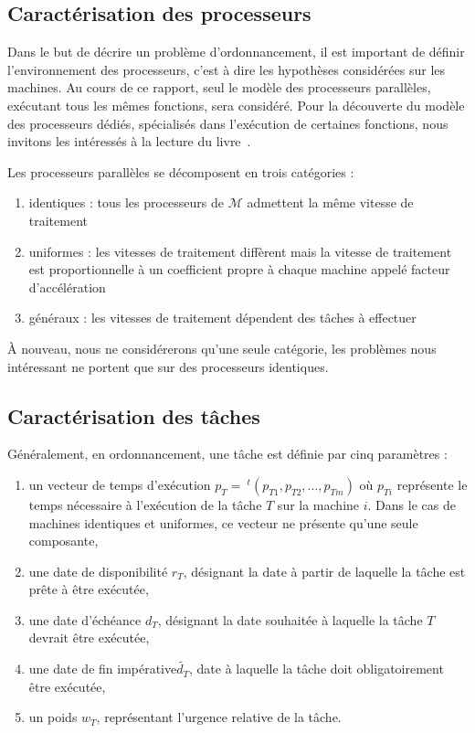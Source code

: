 \subsection{Caractérisation des processeurs}

Dans le but de décrire un problème d'ordonnancement, il est important de définir l'environnement des
processeurs, c'est à dire les hypothèses considérées sur les machines. Au cours de ce rapport, seul
le modèle des processeurs parallèles, exécutant tous les mêmes fonctions, sera considéré. Pour la
découverte du modèle des processeurs dédiés, spécialisés dans l'exécution de certaines fonctions,
nous invitons les intéressés à la lecture du livre~\cite{blazewicz_handbook_2007}.

Les processeurs parallèles se décomposent en trois catégories :
\begin{enumerate}
    \item identiques : tous les processeurs de $\mathcal{M}$ admettent la même vitesse de traitement
    \item uniformes : les vitesses de traitement diffèrent mais la vitesse de traitement est
        proportionnelle à un coefficient propre à chaque machine appelé facteur d'accélération
    \item généraux : les vitesses de traitement dépendent des tâches à effectuer
\end{enumerate}

À nouveau, nous ne considérerons qu'une seule catégorie, les problèmes nous intéressant ne portent
que sur des processeurs identiques.

\subsection{Caractérisation des tâches}

Généralement, en ordonnancement, une tâche est définie par cinq paramètres :
\begin{enumerate}
    \item un vecteur de temps d'exécution $p_T =~^t(p_{T1}, p_{T2}, \dots, p_{Tm})$ où $p_{Ti}$
        représente le temps nécessaire à l'exécution de la tâche $T$ sur la machine $i$. Dans le cas
        de machines identiques et uniformes, ce vecteur ne présente qu'une seule composante,
    \item une date de disponibilité $r_T$, désignant la date à partir de laquelle la tâche est prête
        à être exécutée,
    \item une date d'échéance $d_T$, désignant la date souhaitée à laquelle la tâche $T$ devrait
        être exécutée,
    \item une date de fin impérative$\widetilde{d_T}$, date à laquelle la tâche doit obligatoirement être exécutée,
    \item un poids $w_T$, représentant l'urgence relative de la tâche.
\end{enumerate}

